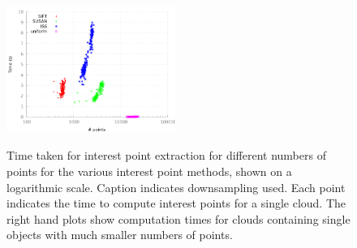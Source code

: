 \documentclass[11pt,a4paper]{kth-mag}
\begin{document}
\begin{figure}
{    \includegraphics[width=0.49\textwidth]{images/interest_agg_0,02}
    \label{subf:agg002}
  }
  \caption{Time taken for interest point extraction for different numbers of
    points for the various interest point methods, shown on a logarithmic scale.
    Caption indicates downsampling used. Each point indicates the time to
    compute interest points for a single cloud. The right hand plots show
    computation times for clouds containing single objects with much smaller numbers of points.}
  \label{fig:interest_agg}
\end{figure}
\end{document}
